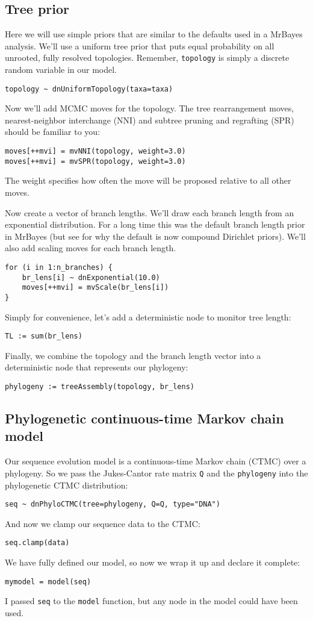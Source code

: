 \documentclass[11pt]{article}
\begin{document}
\subsection{Tree prior}

Here we will use simple priors that are similar to the defaults
used in a MrBayes analysis.
We'll use a uniform tree prior that
puts equal probability on all unrooted, fully resolved topologies.
Remember, \texttt{topology} is simply a discrete random variable
in our model.
\begin{verbatim}
topology ~ dnUniformTopology(taxa=taxa)
\end{verbatim}
Now we'll add MCMC moves for the topology.
The tree rearrangement moves, nearest-neighbor interchange (NNI)
and subtree pruning and regrafting (SPR) should be familiar to you:
\begin{verbatim}
moves[++mvi] = mvNNI(topology, weight=3.0)
moves[++mvi] = mvSPR(topology, weight=3.0)
\end{verbatim}
The weight specifies how often the move will be proposed relative to all
other moves.

Now create a vector of branch lengths. We'll draw each
branch length from an exponential distribution.
For a long time this was the default branch length prior in MrBayes
(but see \citet{rannala2012tail} for why the default is now
compound Dirichlet priors).
We'll also add scaling moves for each branch length.
\begin{verbatim}
for (i in 1:n_branches) {
    br_lens[i] ~ dnExponential(10.0)
    moves[++mvi] = mvScale(br_lens[i])
}
\end{verbatim}
Simply for convenience, let's add a deterministic node to monitor tree length:
\begin{verbatim}
TL := sum(br_lens)
\end{verbatim}
Finally, we combine the topology and the branch length vector into a deterministic node
that represents our phylogeny:
\begin{verbatim}
phylogeny := treeAssembly(topology, br_lens)
\end{verbatim}


\subsection{Phylogenetic continuous-time Markov chain model}

Our sequence evolution model is a continuous-time Markov chain (CTMC) over
a phylogeny. So we pass the Jukes-Cantor rate matrix \texttt{Q}
and the \texttt{phylogeny} into the phylogenetic CTMC distribution:
\begin{verbatim}
seq ~ dnPhyloCTMC(tree=phylogeny, Q=Q, type="DNA")
\end{verbatim}
And now we clamp our sequence data to the CTMC:
\begin{verbatim}
seq.clamp(data)
\end{verbatim}
We have fully defined our model, so now we wrap it up and declare it complete:
\begin{verbatim}
mymodel = model(seq)
\end{verbatim}
I passed \texttt{seq} to the \texttt{model} function, 
but any node in the model could have been used.
\end{document}
